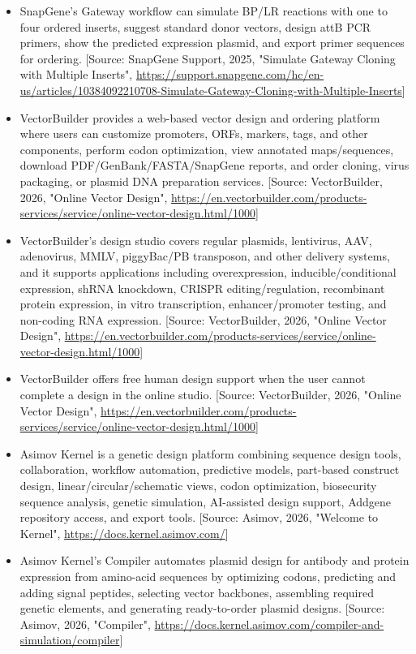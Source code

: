 \documentclass[11pt]{report}
\begin{document}
\begin{itemize}
\item SnapGene's Gateway workflow can simulate BP/LR reactions with one to four ordered inserts, suggest standard donor vectors, design attB PCR primers, show the predicted expression plasmid, and export primer sequences for ordering. [Source: SnapGene Support, 2025, "Simulate Gateway Cloning with Multiple Inserts", \url{https://support.snapgene.com/hc/en-us/articles/10384092210708-Simulate-Gateway-Cloning-with-Multiple-Inserts}]
\item VectorBuilder provides a web-based vector design and ordering platform where users can customize promoters, ORFs, markers, tags, and other components, perform codon optimization, view annotated maps/sequences, download PDF/GenBank/FASTA/SnapGene reports, and order cloning, virus packaging, or plasmid DNA preparation services. [Source: VectorBuilder, 2026, "Online Vector Design", \url{https://en.vectorbuilder.com/products-services/service/online-vector-design.html/1000}]
\item VectorBuilder's design studio covers regular plasmids, lentivirus, AAV, adenovirus, MMLV, piggyBac/PB transposon, and other delivery systems, and it supports applications including overexpression, inducible/conditional expression, shRNA knockdown, CRISPR editing/regulation, recombinant protein expression, in vitro transcription, enhancer/promoter testing, and non-coding RNA expression. [Source: VectorBuilder, 2026, "Online Vector Design", \url{https://en.vectorbuilder.com/products-services/service/online-vector-design.html/1000}]
\item VectorBuilder offers free human design support when the user cannot complete a design in the online studio. [Source: VectorBuilder, 2026, "Online Vector Design", \url{https://en.vectorbuilder.com/products-services/service/online-vector-design.html/1000}]
\item Asimov Kernel is a genetic design platform combining sequence design tools, collaboration, workflow automation, predictive models, part-based construct design, linear/circular/schematic views, codon optimization, biosecurity sequence analysis, genetic simulation, AI-assisted design support, Addgene repository access, and export tools. [Source: Asimov, 2026, "Welcome to Kernel", \url{https://docs.kernel.asimov.com/}]
\item Asimov Kernel's Compiler automates plasmid design for antibody and protein expression from amino-acid sequences by optimizing codons, predicting and adding signal peptides, selecting vector backbones, assembling required genetic elements, and generating ready-to-order plasmid designs. [Source: Asimov, 2026, "Compiler", \url{https://docs.kernel.asimov.com/compiler-and-simulation/compiler}]

\end{itemize}
\end{document}
